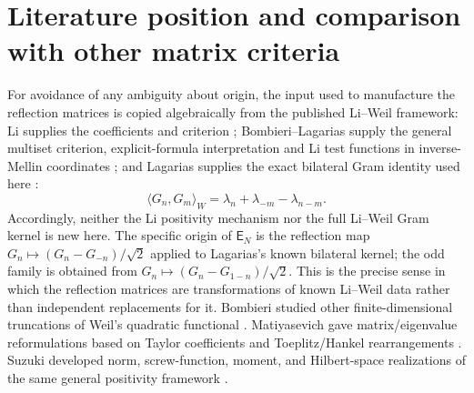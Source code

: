 \documentclass[11pt]{amsart}
\numberwithin{equation}{section}
\theoremstyle{plain}
\theoremstyle{definition}
\theoremstyle{remark}
\newcommand{\E}{\mathsf E}
\begin{document}
\section{Literature position and comparison with other matrix criteria}
\label{sec:literature_position}

For avoidance of any ambiguity about origin, the input used to manufacture the reflection matrices is copied algebraically from the published Li--Weil framework: Li supplies the coefficients and criterion \cite{Li1997}; Bombieri--Lagarias supply the general multiset criterion, explicit-formula interpretation and Li test functions in inverse-Mellin coordinates \cite{BombieriLagarias1999}; and Lagarias supplies the exact bilateral Gram identity used here \cite[Theorem~3.1]{Lagarias2007}:
\begin{equation}
\langle G_n,G_m\rangle_W
=\lambda_n+\lambda_{-m}-\lambda_{n-m}.
\label{eq:literature_Lagarias_exact}
\end{equation}
Accordingly, neither the Li positivity mechanism nor the full Li--Weil Gram kernel is new here.
The specific origin of \(\E_N\) is the reflection map
\(G_n\mapsto (G_n-G_{-n})/\sqrt2\) applied to Lagarias's known bilateral kernel; the odd family is
obtained from \(G_n\mapsto(G_n-G_{1-n})/\sqrt2\).  This is the precise sense in which the reflection
matrices are transformations of known Li--Weil data rather than independent replacements for it.
Bombieri studied other finite-dimensional truncations of Weil's quadratic functional
\cite{Bombieri2000}.  Matiyasevich gave matrix/eigenvalue reformulations based on Taylor
coefficients and Toeplitz/Hankel rearrangements \cite{Matiyasevich2007a,Matiyasevich2007b}.
Suzuki developed norm, screw-function, moment, and Hilbert-space realizations of the same general
positivity framework \cite{Suzuki2023Norms,Suzuki2023Screw,Suzuki2025Hilbert}.
\end{document}
